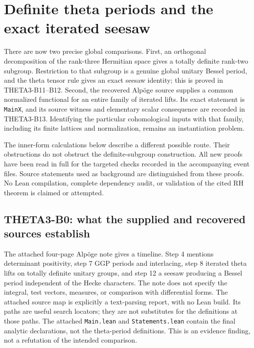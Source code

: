 \section{Definite theta periods and the exact iterated seesaw}

There are now two precise global comparisons. First, an orthogonal decomposition of the rank-three Hermitian space gives a totally definite rank-two subgroup. Restriction to that subgroup is a genuine global unitary Bessel period, and the theta tensor rule gives an exact seesaw identity; this is proved in THETA3-B11--B12. Second, the recovered Alp\"oge source supplies a common normalized functional for an entire family of iterated lifts. Its exact statement is \texttt{MainX}, and its source witness and elementary scalar consequence are recorded in THETA3-B13. Identifying the particular cohomological inputs with that family, including its finite lattices and normalization, remains an instantiation problem.

The inner-form calculations below describe a different possible route. Their obstructions do not obstruct the definite-subgroup construction. All new proofs have been read in full for the targeted checks recorded in the accompanying event files. Source statements used as background are distinguished from these proofs. No Lean compilation, complete dependency audit, or validation of the cited RH theorem is claimed or attempted.

\subsection{THETA3-B0: what the supplied and recovered sources establish}\label{B0}

The attached four-page Alp\"oge note gives a timeline. Step 4 mentions determinant positivity, step 7 GGP periods and interlacing, step 8 iterated theta lifts on totally definite unitary groups, and step 12 a seesaw producing a Bessel period independent of the Hecke characters. The note does not specify the integral, test vectors, measures, or comparison with differential forms. The attached source map is explicitly a text-parsing report, with no Lean build. Its paths are useful search locators; they are not substitutes for the definitions at those paths. The attached \texttt{Main.lean} and \texttt{Statements.lean} contain the final analytic declarations, not the theta-period definitions. This is an evidence finding, not a refutation of the intended comparison.

